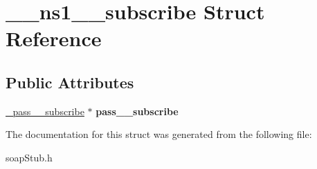 \hypertarget{struct____ns1____subscribe}{
\section{\_\-\_\-ns1\_\-\_\-subscribe Struct Reference}
\label{struct____ns1____subscribe}
}
\subsection*{Public Attributes}
\begin{DoxyCompactItemize}
\item 
\hypertarget{struct____ns1____subscribe_ac63fda5b87c094e41f5453a53f44e34b}{
\hyperlink{class__pass____subscribe}{\_\-pass\_\-\_\-subscribe} $\ast$ {\bfseries pass\_\-\_\-subscribe}}
\label{struct____ns1____subscribe_ac63fda5b87c094e41f5453a53f44e34b}

\end{DoxyCompactItemize}


The documentation for this struct was generated from the following file:\begin{DoxyCompactItemize}
\item 
soapStub.h\end{DoxyCompactItemize}
